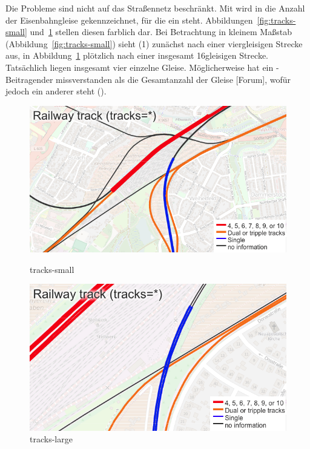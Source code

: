 \documentclass[../main/thesis.tex]{subfiles}
\begin{document}


Die Probleme sind nicht auf das Straßennetz beschränkt. Mit  wird in \osm{} die Anzahl der Eisenbahngleise gekennzeichnet, für die ein  steht. Abbildungen~\ref{fig:tracks-small} und~\ref{fig:tracks-large} stellen diesen  farblich dar. Bei Betrachtung in kleinem Maßstab (Abbildung~\ref{fig:tracks-small}) sieht (1) zunächst nach einer viergleisigen Strecke aus, in Abbildung~\ref{fig:tracks-large} plötzlich nach einer insgesamt 16gleisigen Strecke. Tatsächlich liegen insgesamt vier einzelne Gleise. Möglicherweise hat ein \osm-Beitragender  missverstanden als die Gesamtanzahl der Gleise [Forum], wofür jedoch ein anderer  steht ().

\begin{figure}[ht]
  \begin{minipage}{.5\linewidth}
    \centering
    \includegraphics[width=\ScaleIfNeeded]{../chapter2/tracks-small}
    \caption{tracks-small}\label{fig:tracks-small}
  \end{minipage}%
  \begin{minipage}{.5\linewidth}
    \centering
    \includegraphics[width=\ScaleIfNeeded]{../chapter2/tracks-large}
    \caption{tracks-large}\label{fig:tracks-large}
  \end{minipage}
\end{figure}
\end{document}
